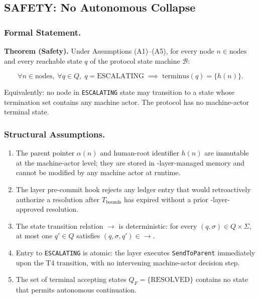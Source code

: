\subsection{SAFETY: No Autonomous Collapse}

\subsubsection{Formal Statement.}

\begin{bluebox}
\textbf{Theorem (Safety).} Under Assumptions (A1)--(A5), for every node $n \in \text{nodes}$ and every reachable state $q$ of the protocol state machine $\mathcal{B}$:

\[
\forall n \in \text{nodes},\; \forall q \in Q,\;
q = \text{ESCALATING} \;\implies\; \text{terminus}(q) = \{h(n)\}.
\tag{SAFETY}
\]

Equivalently: no \bxthree{} node in \texttt{ESCALATING} state may transition to a state whose termination set contains any machine actor. The protocol has no machine-actor terminal state.
\end{bluebox}

\subsubsection{Structural Assumptions.}

\begin{enumerate}
\item[(A1)] The parent pointer $\alpha(n)$ and human-root identifier $h(n)$ are immutable at the machine-actor level; they are stored in \fact-layer-managed memory and cannot be modified by any machine actor at runtime.
\item[(A2)] The \fact{} layer pre-commit hook rejects any ledger entry that would retroactively authorize a resolution after $T_{\text{bounds}}$ has expired without a prior \fact-layer-approved resolution.
\item[(A3)] The state transition relation $\rightarrow$ is deterministic: for every $(q, \sigma) \in Q \times \Sigma$, at most one $q' \in Q$ satisfies $(q, \sigma, q') \in \rightarrow$.
\item[(A4)] Entry to \texttt{ESCALATING} is atomic: the \fact{} layer executes \texttt{SendToParent} immediately upon the T4 transition, with no intervening machine-actor decision step.
\item[(A5)] The set of terminal accepting states $Q_F = \{\text{RESOLVED}\}$ contains no state that permits autonomous continuation.
\end{enumerate}

